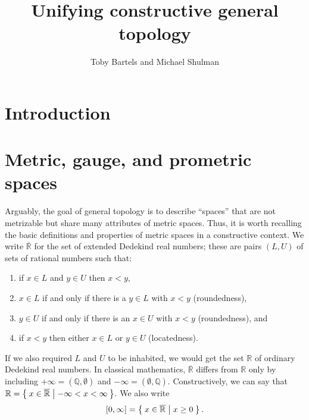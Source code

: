 \documentclass{article}
\title{Unifying constructive general topology}
\author{Toby Bartels and Michael Shulman}
\def\R{\mathbb{R}}
\def\Re{\overline{\mathbb{R}}}
\def\Rp{[0,\infty]}
\begin{document}
\maketitle

\section{Introduction}
\label{sec:intro}

\section{Metric, gauge, and prometric spaces}
\label{sec:metric}


Arguably, the goal of general topology is to describe ``spaces'' that are not metrizable but share many attributes of metric spaces.
Thus, it is worth recalling the basic definitions and properties of metric spaces in a constructive context.
We write $\Re$ for the set of extended Dedekind real numbers; these are pairs $(L,U)$ of sets of rational numbers such that:
\begin{enumerate}
\item if $x\in L$ and $y\in U$ then $x<y$,
\item $x\in L$ if and only if there is a $y\in L$ with $x<y$ (roundedness),
\item $y\in U$ if and only if there is an $x\in U$ with $x<y$ (roundedness), and
\item if $x<y$ then either $x\in L$ or $y\in U$ (locatedness).
\end{enumerate}
If we also required $L$ and $U$ to be inhabited, we would get the set $\R$ of ordinary Dedekind real numbers.
In classical mathematics, $\Re$ differs from $\R$ only by including $+\infty = (\mathbb{Q},\emptyset)$ and $-\infty = (\emptyset,\mathbb{Q})$.
Constructively, we can say that $\R = \setof{ x\in \Re | -\infty < x < \infty }$.
We also write
\[\Rp = \setof{x\in\Re | x\ge 0 }.\]
\end{document}
